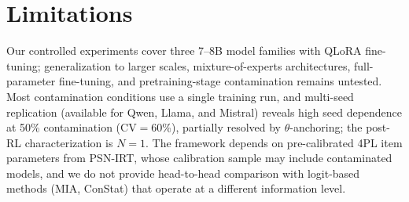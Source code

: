 \section*{Limitations}

Our controlled experiments cover three 7--8B model families with QLoRA fine-tuning; generalization to larger scales, mixture-of-experts architectures, full-parameter fine-tuning, and pretraining-stage contamination remains untested.
Most contamination conditions use a single training run, and multi-seed replication (available for Qwen, Llama, and Mistral) reveals high seed dependence at 50\% contamination (CV${=}$60\%), partially resolved by $\theta$-anchoring; the post-RL characterization is $N{=}1$.
The framework depends on pre-calibrated 4PL item parameters from PSN-IRT, whose calibration sample may include contaminated models, and we do not provide head-to-head comparison with logit-based methods (MIA, ConStat) that operate at a different information level.
